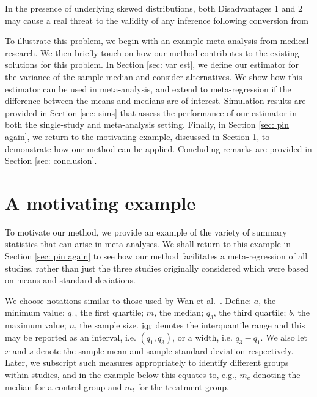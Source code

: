 \documentclass{article}
\begin{document}
In the presence of underlying skewed distributions, both Disadvantages 1 and 2 may cause a real threat to the validity of any inference following conversion from

To illustrate this problem, we begin with an example meta-analysis from medical research. We then briefly touch on how our method contributes to the existing solutions for this problem. In Section \ref{sec: var est}, we define our estimator for the variance of the sample median and consider alternatives. We show how this estimator can be used in meta-analysis, and extend to meta-regression if the difference between the means and medians are of interest. Simulation results are provided in Section \ref{sec: sims} that assess the performance of our estimator in both the single-study and meta-analysis setting.   Finally, in Section \ref{sec: pin again}, we return to the motivating example, discussed in Section \ref{sec: motiv}, to demonstrate how our method can be applied. Concluding remarks are provided in Section \ref{sec: conclusion}.

\section{A motivating example}
\label{sec: motiv}

To motivate our method, we provide an example of the variety of summary statistics that can arise in meta-analyses. We shall return to this example in Section \ref{sec: pin again} to see how our method facilitates a meta-regression of all studies, rather than just the three studies originally considered which were based on means and standard deviations.

We choose notations similar to those used by Wan et al.~\cite{wanEstimatingSampleMean2014}.  Define:
$a$, the minimum value;
$q_1$, the first quartile;
$m$, the median;
$q_3$, the third quartile;
$b$, the maximum value;
$n$, the sample size.  $\operatorname{iqr}$ denotes the interquantile range and this may be reported as an interval, i.e. $(q_1,q_3)$, or a width, i.e. $q_3-q_1$. We also let $\overline{x}$ and $s$ denote the sample mean and sample standard deviation respectively.  Later, we subscript such measures appropriately to identify different groups within studies, and in the example below this equates to, e.g., $m_c$ denoting the median for a control group and $m_t$ for the treatment group.
\end{document}
